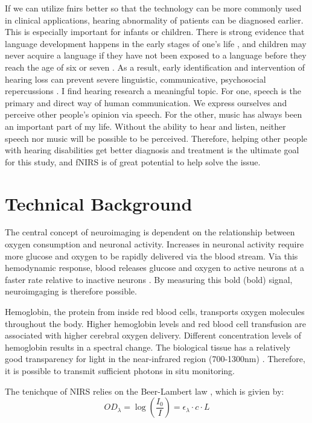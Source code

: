 If we can utilize \acrshort{fnirs} better so that the technology can be more commonly used in clinical applications, hearing abnormality of patients can be diagnosed earlier. This is especially important for infants or children. There is strong evidence that language development happens in the early stages of one's life \citep {Elissa1990}, and children may never acquire a language if they have not been exposed to a language before they reach the age of six or seven \citep {clark2000first}. As a result, early identification and intervention of hearing loss can prevent severe linguistic, communicative, psychosocial repercussions \citep {Robinshaw1995} \citep {Yoshinaga1998}. I find hearing research a meaningful topic. For one, speech is the primary and direct way of human communication. We express ourselves and perceive other people's opinion via speech. For the other, music has always been an important part of my life. Without the ability to hear and listen, neither speech nor music will be possible to be perceived. Therefore, helping other people with hearing disabilities get better diagnosis and treatment is the ultimate goal for this study, and fNIRS is of great potential to help solve the issue.

\section{Technical Background}
The central concept of neuroimaging is dependent on the relationship between oxygen consumption and neuronal activity. Increases in neuronal activity require more glucose and oxygen to be rapidly delivered via the blood stream. Via this hemodynamic response, blood releases glucose and oxygen to active neurons at a faster rate relative to inactive neurons \citep {Pelphrey2013}. By measuring this \acrlong{bold} (\acrshort{bold}) signal, neuroimgaging is therefore possible.

Hemoglobin, the protein from inside red blood cells, transports oxygen molecules throughout the body. Higher hemoglobin levels and red blood cell transfusion are associated with higher cerebral oxygen delivery. Different concentration levels of hemoglobin results in a spectral change. The biological tissue has a relatively good transparency for light in the near-infrared region (700-1300nm) \citep{doi:10.1126/science.929199}. Therefore, it is possible to transmit sufficient photons in situ monitoring. 

\newpage
The tenichque of NIRS relies on the Beer-Lambert law \citep{ BeerLambert}, which is givien by:
\begin{equation} 
OD_{\lambda} = \log \left(\frac {I_0}{I}\right) = \epsilon _{\lambda} \cdot c \cdot L
\end{equation}

